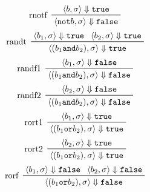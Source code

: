 \begin{multicols}{2}
\begin{equation*}
											\end{equation*}
											\begin{equation*}
												\prftree[l]
												{ rnotf }
												{ \langle b, \sigma \rangle \Downarrow \texttt{true} }
												{ \langle \texttt{not} b, \sigma \rangle \Downarrow \texttt{false} }
											\end{equation*}
											\begin{equation*}
												\prftree[l]
												{ randt }
												{ \langle b _ 1, \sigma \rangle \Downarrow \texttt{true} }
												{ \langle b _ 2, \sigma \rangle \Downarrow \texttt{true} }
												{ \langle (b _ 1 \texttt{and} b _ 2), \sigma \rangle \Downarrow \texttt{true} }
											\end{equation*}
											\begin{equation*}
												\prftree[l]
												{ randf1 }
												{ \langle b _ 1, \sigma \rangle \Downarrow \texttt{false} }
												{ \langle (b _ 1 \texttt{and} b _ 2), \sigma \rangle \Downarrow \texttt{false} }
											\end{equation*}
											\begin{equation*}
												\prftree[l]
												{ randf2 }
												{ \langle b _ 2, \sigma \rangle \Downarrow \texttt{false} }
												{ \langle (b _ 1 \texttt{and} b _ 2), \sigma \rangle \Downarrow \texttt{false} }
											\end{equation*}
											\begin{equation*}
												\prftree[l]
												{ rort1 }
												{ \langle b _ 1, \sigma \rangle \Downarrow \texttt{true} }
												{ \langle (b _ 1 \texttt{or} b _ 2), \sigma \rangle \Downarrow \texttt{true} }
											\end{equation*}
											\begin{equation*}
												\prftree[l]
												{ rort2 }
												{ \langle b _ 2, \sigma \rangle \Downarrow \texttt{true} }
												{ \langle (b _ 1 \texttt{or} b _ 2), \sigma \rangle \Downarrow \texttt{true} }
											\end{equation*}
											\begin{equation*}
												\prftree[l]
												{ rorf }
												{ \langle b _ 1, \sigma \rangle \Downarrow \texttt{false} }
												{ \langle b _ 2, \sigma \rangle \Downarrow \texttt{false} }
												{ \langle (b _ 1 \texttt{or} b _ 2), \sigma \rangle \Downarrow \texttt{false} }
											\end{equation*}
										\end{multicols}

